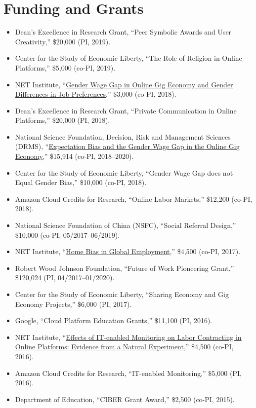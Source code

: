 \documentclass[paper=letter,fontsize=10pt]{scrartcl} %
\newcommand{\NewPart}[2]{\section*{{#1} #2}}
\newcommand{\FundingEntry}[5]{
        \noindent #1, ``#2,'' \$#3 (#4, #5).}
\begin{document}
\NewPart{Funding and Grants}{}
\begin{itemize}
\item \FundingEntry {Dean’s Excellence in Research Grant}{Peer Symbolic Awards and User Creativity}{20,000}{PI}{2019}
\item \FundingEntry {Center for the Study of Economic Liberty}{The Role of Religion in Online Platforms}{5,000}{co-PI}{2019}
\item \FundingEntry {NET Institute}{\href{http://www.netinst.org/Chen_18-03.pdf}{Gender Wage Gap in Online Gig Economy and Gender Differences in Job Preferences}}{3,000}{co-PI}{2018}
\item \FundingEntry {Dean’s Excellence in Research Grant}{Private Communication in Online Platforms}{20,000}{PI}{2018}
\item \FundingEntry {National Science Foundation, Decision, Risk and Management Sciences (DRMS)}{\href{https://www.nsf.gov/awardsearch/showAward?AWD_ID=1824432}{Expectation Bias and the Gender Wage Gap in the Online Gig Economy}}{15,914}{co-PI}{2018--2020}
\item \FundingEntry {Center for the Study of Economic Liberty}{Gender Wage Gap does not Equal Gender Bias}{10,000}{co-PI}{2018}
\item \FundingEntry {Amazon Cloud Credits for Research}{Online Labor Markets}{12,200}{co-PI}{2018}
\item \FundingEntry {National Science Foundation of China (NSFC)}{Social Referral Design}{10,000}{co-PI}{05/2017--06/2019}
\item \FundingEntry {NET Institute}{\href{http://www.netinst.org/Liang_17-06.pdf}{Home Bias in Global Employment}}{4,500}{co-PI}{2017}
\item \FundingEntry {Robert Wood Johnson Foundation}{Future of Work Pioneering Grant}{120,024}{PI}{04/2017--01/2020}
\item \FundingEntry {Center for the Study of Economic Liberty}{Sharing Economy and Gig Economy Projects}{6,000}{PI}{2017}
\item \FundingEntry {Google}{Cloud Platform Education Grants}{11,100}{PI}{2016}
\item \FundingEntry {NET Institute}{\href{http://www.netinst.org/Liang_16-01.pdf}{Effects of IT-enabled Monitoring on Labor Contracting in Online Platforms: Evidence from a Natural Experiment}}{4,500}{co-PI}{2016}
\item \FundingEntry {Amazon Cloud Credits for Research}{IT-enabled Monitoring}{5,000}{PI}{2016}
\item \FundingEntry {Department of Education}{CIBER Grant Award}{2,500}{co-PI}{2015}

\end{itemize}
\end{document}
